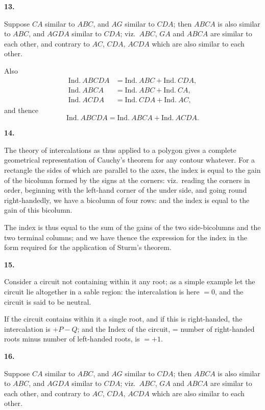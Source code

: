 \documentclass[11pt,a4paper]{book}
\begin{document}
\textbf{13.}

Suppose $CA$ similar to $ABC$, and $AG$ similar to $CDA$; then $ABCA$ is also similar to $ABC$, and $AGDA$ similar to $CDA$; viz.\ $ABC$, $GA$ and $ABCA$ are similar to each other, and contrary to $AC$, $CDA$, $ACDA$ which are also similar to each other.

Also
\begin{align*}
\text{Ind.}\ ABCDA &= \text{Ind.}\ ABC + \text{Ind.}\ CDA,\\
\text{Ind.}\ ABCA &= \text{Ind.}\ ABC + \text{Ind.}\ CA,\\
\text{Ind.}\ ACDA &= \text{Ind.}\ CDA + \text{Ind.}\ AC,
\end{align*}
and thence
\[
\text{Ind.}\ ABCDA = \text{Ind.}\ ABCA + \text{Ind.}\ ACDA.
\]

\newpage
\setcounter{page}{26}

\textbf{14.}

The theory of intercalations as thus applied to a polygon gives a complete geometrical representation of Cauchy's theorem for any contour whatever. For a rectangle the sides of which are parallel to the axes, the index is equal to the gain of the bicolumn formed by the signs at the corners: viz.\ reading the corners in order, beginning with the left-hand corner of the under side, and going round right-handedly, we have a bicolumn of four rows: and the index is equal to the gain of this bicolumn.

The index is thus equal to the sum of the gains of the two side-bicolumns and the two terminal columns; and we have thence the expression for the index in the form required for the application of Sturm's theorem.

\textbf{15.}

Consider a circuit not containing within it any root; as a simple example let the circuit lie altogether in a sable region: the intercalation is here $= 0$, and the circuit is said to be neutral.

If the circuit contains within it a single root, and if this is right-handed, the intercalation is $+P - Q$; and the Index of the circuit, = number of right-handed roots minus number of left-handed roots, is $= +1$.

\newpage
\setcounter{page}{27}

\textbf{16.}

Suppose $CA$ similar to $ABC$, and $AG$ similar to $CDA$; then $ABCA$ is also similar to $ABC$, and $AGDA$ similar to $CDA$; viz.\ $ABC$, $GA$ and $ABCA$ are similar to each other, and contrary to $AC$, $CDA$, $ACDA$ which are also similar to each other.
\end{document}
